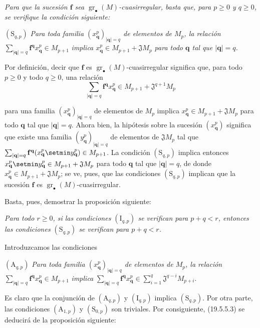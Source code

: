 \begin{env}[19.5.5.2]
\label{IV.19.5.5.2}
\emph{Para que la sucesión $\mathbf f$ sea $\operatorname{gr}_\bullet(M)$-cuasirregular, basta que, para $p\geq0$ y $q\geq0$, se verifique la condición siguiente:}

$(\mathrm S_{q,p})$ \emph{Para toda familia $(x_{\mathbf q}^p)_{|\mathbf q|=q}$ de elementos de $M_p$, la relación}
$\sum_{|\mathbf q|=q}\mathbf f^{\mathbf q}x_{\mathbf q}^p\in M_{p+1}$
\emph{implica $x_{\mathbf q}^p\in M_{p+1}+\mathfrak JM_p$ para todo $\mathbf q$ tal que $|\mathbf q|=q$.}

Por definición, decir que $\mathbf f$ es $\operatorname{gr}_\bullet(M)$-cuasirregular significa que, para todo $p\geq0$ y todo $q\geq0$, una relación
\[
  \sum_{|\mathbf q|=q}\mathbf f^{\mathbf q}x_{\mathbf q}^p\in M_{p+1}+\mathfrak J^{q+1}M_p
\]

para una familia $(x_{\mathbf q}^p)_{|\mathbf q|=q}$ de elementos de $M_p$ implica $x_{\mathbf q}^p\in M_{p+1}+\mathfrak JM_p$ para todo $\mathbf q$ tal que $|\mathbf q|=q$. Ahora bien, la hipótesis sobre la sucesión $(x_{\mathbf q}^p)$ significa que existe una familia $(y_{\mathbf q}^p)_{|\mathbf q|=q}$ de elementos de $\mathfrak JM_p$ tal que $\sum_{|\mathbf q|=q}\mathbf f^{\mathbf q}(x_{\mathbf q}^p\setmin y_{\mathbf q}^p)\in M_{p+1}$. La condición $(\mathrm S_{q,p})$ implica entonces $x_{\mathbf q}^p\setmin y_{\mathbf q}^p\in M_{p+1}+\mathfrak JM_p$ para todo $\mathbf q$ tal que $|\mathbf q|=q$, de donde $x_{\mathbf q}^p\in M_{p+1}+\mathfrak JM_p$; se ve, pues, que las condiciones $(\mathrm S_{q,p})$ implican que la sucesión $\mathbf f$ es $\operatorname{gr}_\bullet(M)$-cuasirregular.
\end{env}

Basta, pues, demostrar la proposición siguiente:

\begin{env}[19.5.5.3]
\label{IV.19.5.5.3}
\emph{Para todo $r\geq0$, si las condiciones $(\mathrm I_{q,p})$ se verifican para $p+q<r$, entonces las condiciones $(\mathrm S_{q,p})$ se verifican para $p+q<r$.}

Introduzcamos las condiciones

$(\mathrm A_{q,p})$ \emph{Para toda familia $(x_{\mathbf q}^p)_{|\mathbf q|=q}$ de elementos de $M_p$, la relación}
$\sum_{|\mathbf q|=q}\mathbf f^{\mathbf q}x_{\mathbf q}^p\in M_{p+1}$
\emph{implica}
$\sum_{|\mathbf q|=q}\mathbf f^{\mathbf q}x_{\mathbf q}^p\in\sum_{i=1}^q\mathfrak J^{q-i}M_{p+i}$.

Es claro que la conjunción de $(\mathrm A_{q,p})$ y $(\mathrm I_{q,p})$ implica $(\mathrm S_{q,p})$. Por otra parte, las condiciones $(\mathrm A_{1,p})$ y $(\mathrm S_{0,p})$ son triviales. Por consiguiente, (19.5.5.3) se deducirá de la proposición siguiente:
\end{env}


